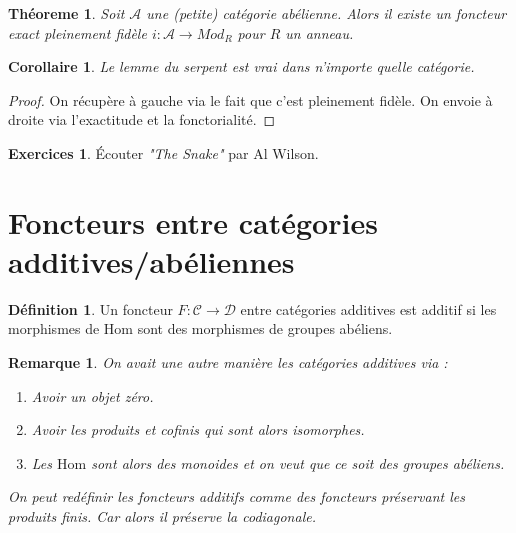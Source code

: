 \documentclass[a4paper,12pt]{book}
\newcommand{\Cat}{\mathcal{C}}
\newcommand{\Hom}{\textrm{Hom}}
\theoremstyle{plain}
\newtheorem{thm}[subsection]{Théoreme}
\newtheorem{cor}[subsection]{Corollaire}
\newtheorem{rem}{Remarque}
\theoremstyle{definition}
\newtheorem{defn}[subsection]{Définition}
\newtheorem{exo}[subsection]{Exercices}
\theoremstyle{remark}
\begin{document}
\begin{thm}
    Soit $\mathcal A$ une (petite) catégorie abélienne. Alors il existe
    un foncteur exact pleinement fidèle $i\colon\mathcal A\to Mod_R$ 
    pour $R$ un anneau.
\end{thm}
\begin{cor}
    Le lemme du serpent est vrai dans n'importe quelle catégorie.
\end{cor}
\begin{proof}
    On récupère à gauche via le fait que c'est pleinement fidèle.
    On envoie à droite via l'exactitude et la fonctorialité. 
\end{proof}

\begin{exo}
    Écouter \textit{"The Snake"} par Al Wilson.
\end{exo}

\section{Foncteurs entre catégories additives/abéliennes}
\begin{defn}
    Un foncteur $F\colon \Cat\to \mathcal D$ entre catégories additives
    est additif si les morphismes de $\Hom$ sont des morphismes
    de groupes abéliens.
\end{defn}

\begin{rem}
    On avait une autre manière les catégories additives via :
    \begin{enumerate}
	\item Avoir un objet zéro.
	\item Avoir les produits et cofinis qui sont alors isomorphes.
	\item Les $\Hom$ sont alors des monoides et on veut que ce
	    soit des groupes abéliens.
    \end{enumerate}
    On peut redéfinir les foncteurs additifs comme des foncteurs
    préservant les produits finis. Car alors il préserve la codiagonale.
\end{rem}




\printbibliography
\end{document}
